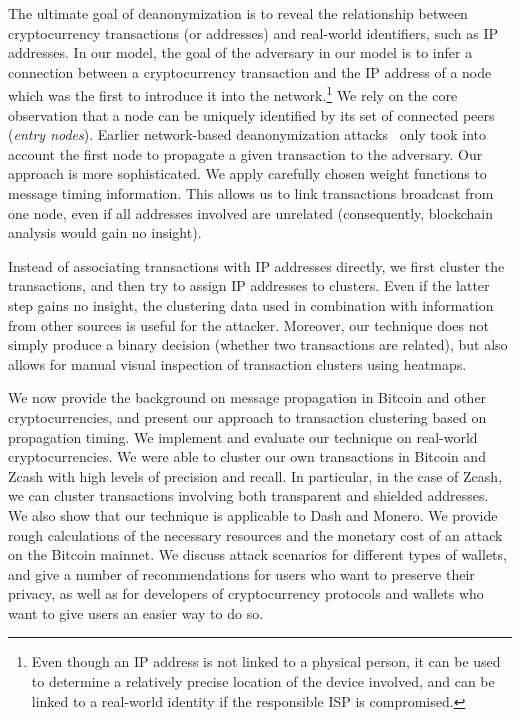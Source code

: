 The ultimate goal of deanonymization is to reveal the relationship between cryptocurrency transactions (or addresses) and real-world identifiers, such as IP addresses.
In our model, the goal of the adversary in our model is to infer a connection between a cryptocurrency transaction and the IP address of a node which was the first to introduce it into the network.\footnote{Even though an IP address is not linked to a physical person, it can be used to determine a relatively precise location of the device involved, and can be linked to a real-world identity if the responsible ISP is compromised.}
We rely on the core observation that a node can be uniquely identified by its set of connected peers (\textit{entry nodes}).
Earlier network-based deanonymization attacks~\cite{Biryukov2014, Koshy2014} only took into account the first node to propagate a given transaction to the adversary.
Our approach is more sophisticated.
We apply carefully chosen weight functions to message timing information.
This allows us to link transactions broadcast from one node, even if all addresses involved are unrelated (consequently, blockchain analysis would gain no insight).

Instead of associating transactions with IP addresses directly, we first cluster the transactions, and then try to assign IP addresses to clusters.
Even if the latter step gains no insight, the clustering data used in combination with information from other sources is useful for the attacker.
Moreover, our technique does not simply produce a binary decision (whether two transactions are related), but also allows for manual visual inspection of transaction clusters using heatmaps.

We now provide the background on message propagation in Bitcoin and other cryptocurrencies, and present our approach to transaction clustering based on propagation timing.
We implement and evaluate our technique on real-world cryptocurrencies.
We were able to cluster our own transactions in Bitcoin and Zcash with high levels of precision and recall.
In particular, in the case of Zcash, we can cluster transactions involving both transparent and shielded addresses.
We also show that our technique is applicable to Dash and Monero.
We provide rough calculations of the necessary resources and the monetary cost of an attack on the Bitcoin mainnet.
We discuss attack scenarios for different types of wallets, and give a number of recommendations for users who want to preserve their privacy, as well as for developers of cryptocurrency protocols and wallets who want to give users an easier way to do so.


